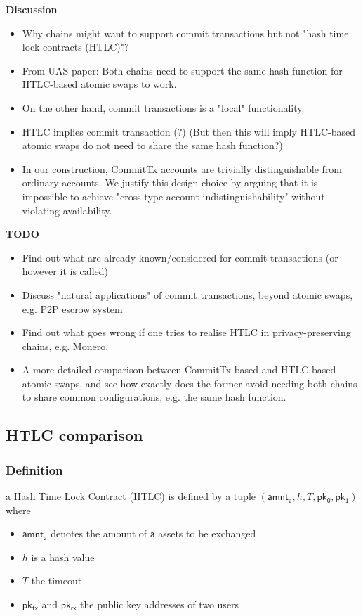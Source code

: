 \documentclass{article}      	%
\begin{document}
\begin{todobox}
\textbf{Discussion}
\begin{itemize}
    \item Why chains might want to support commit transactions but not "hash time lock contracts (HTLC)"? 
    \item From UAS paper: Both chains need to support the same hash function for HTLC-based atomic swaps to work. 
    \item On the other hand, commit transactions is a "local" functionality. 
    \item HTLC implies commit transaction (?) (But then this will imply HTLC-based atomic swaps do not need to share the same hash function?)
    \item In our construction, CommitTx accounts are trivially distinguishable from ordinary accounts. We justify this design choice by arguing that it is impossible to achieve "cross-type account indistinguishability" without violating availability.
\end{itemize}
\textbf{TODO}
\begin{itemize}
    \item Find out what are already known/considered for commit transactions (or however it is called)
    \item Discuss "natural applications" of commit transactions, beyond atomic swaps, e.g. P2P escrow system 
    \item Find out what goes wrong if one tries to realise HTLC in privacy-preserving chains, e.g. Monero.
    \item A more detailed comparison between CommitTx-based and HTLC-based atomic swaps, and see how exactly does the former avoid needing both chains to share common configurations, e.g. the same hash function.
\end{itemize}
\end{todobox}

\subsection{HTLC comparison}

\subsubsection{Definition}
a Hash Time Lock Contract (HTLC) is defined by a tuple $(\mathsf{amnt_a}, h, T, \mathsf{pk_0}, \mathsf{pk_1})$ where 
\begin{itemize}
	\item $\mathsf{amnt_a}$ denotes the amount of $\mathsf{a}$ assets to be exchanged
	\item $h$ is a hash value
	\item $T$ the timeout
	\item $\mathsf{pk_{tx}}$ and $\mathsf{pk_{rx}}$ the public key addresses of two users
\end{itemize}
\end{document}
